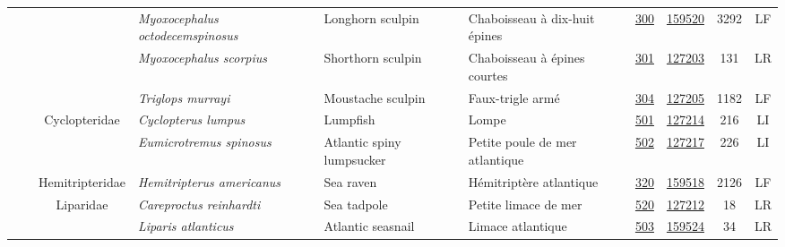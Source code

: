 \documentclass[12pt]{article}\usepackage[]{graphicx}\usepackage[]{color}
\begin{document}
\begin{landscapepage}
\begin{longtable}[t]{ccc>{\centering\arraybackslash}p{3cm}>{\centering\arraybackslash}p{3cm}>{\centering\arraybackslash}p{3cm}>{}c>{}ccc}
\hspace{1em}\hspace{1em} &  &  & \em{Myoxocephalus octodecemspinosus} & Longhorn sculpin & Chaboisseau à dix-huit épines & \href{#sec:701}{300} & \href{http://www.marinespecies.org/aphia.php?p=taxdetails&id=159828}{159520} & 3292 & LF\\
\hspace{1em}\hspace{1em} &  &  & \em{Myoxocephalus scorpius} & Shorthorn sculpin & Chaboisseau à épines courtes & \href{#sec:60}{301} & \href{http://www.marinespecies.org/aphia.php?p=taxdetails&id=126417}{127203} & 131 & LR\\
\hspace{1em}\hspace{1em} &  &  & \em{Triglops murrayi} & Moustache sculpin & Faux-trigle armé & \href{#sec:61}{304} & \href{http://www.marinespecies.org/aphia.php?p=taxdetails&id=158670}{127205} & 1182 & LF\\
\hspace{1em}\hspace{1em} &  & Cyclopteridae & \em{Cyclopterus lumpus} & Lumpfish & Lompe & \href{#sec:62}{501} & \href{http://www.marinespecies.org/aphia.php?p=taxdetails&id=158669}{127214} & 216 & LI\\
\hspace{1em}\hspace{1em} &  &  & \em{Eumicrotremus spinosus} & Atlantic spiny lumpsucker & Petite poule de mer atlantique & \href{#sec:63}{502} & \href{http://www.marinespecies.org/aphia.php?p=taxdetails&id=126737}{127217} & 226 & LI\\
\hspace{1em}\hspace{1em} &  & Hemitripteridae & \em{Hemitripterus americanus} & Sea raven & Hémitriptère atlantique & \href{#sec:64}{320} & \href{http://www.marinespecies.org/aphia.php?p=taxdetails&id=126735}{159518} & 2126 & LF\\
\hspace{1em}\hspace{1em} &  & Liparidae & \em{Careproctus reinhardti} & Sea tadpole & Petite limace de mer & \href{#sec:149}{520} & \href{http://www.marinespecies.org/aphia.php?p=taxdetails&id=158868}{127212} & 18 & LR\\
\hspace{1em}\hspace{1em} &  &  & \em{Liparis atlanticus} & Atlantic seasnail & Limace atlantique & \href{#sec:156}{503} & \href{http://www.marinespecies.org/aphia.php?p=taxdetails&id=126336}{159524} & 34 & LR\\

\end{longtable}
\end{landscapepage}
\end{document}
